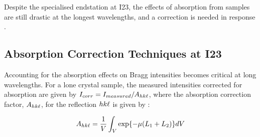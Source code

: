 
Despite the specialised endstation at I23, the effects of absorption from samples are still drastic at the longest wavelengths, and a correction is needed in response \cite{Kazantsev2021}.

\subsection{Absorption Correction Techniques at I23}





Accounting for the absorption effects on Bragg intensities becomes critical at long wavelengths. For a lone crystal sample, the measured intensities corrected for absorption are given by $I_{corr} = I_{measured}/A_{hk\ell}$, where the absorption correction factor, $A_{hk\ell}$, for the reflection $hk\ell$ is given by \cite{Albrecht1939}: %

\begin{equation}
    A_{hk\ell} = \frac{1}{V} \int_V \exp{-\mu(L_1+L_2)} dV
    \label{AbsFactor}
\end{equation}


